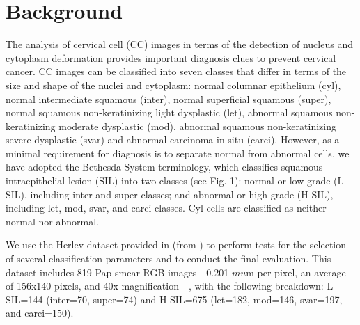 \documentclass{bmcart}
\begin{document}


\section*{Background}
The analysis of cervical cell (CC) images in terms of the detection of nucleus and cytoplasm deformation provides important diagnosis clues to prevent cervical cancer. CC images can be classified into seven classes\cite{1} that differ in terms of the size and shape of the nuclei and cytoplasm: normal columnar epithelium (cyl), normal intermediate squamous (inter), normal superficial squamous (super), normal squamous non-keratinizing light dysplastic (let), abnormal squamous non-keratinizing moderate dysplastic (mod), abnormal squamous non-keratinizing severe dysplastic (svar) and abnormal carcinoma in situ (carci). However, as a minimal requirement for diagnosis is to separate normal from abnormal cells\cite{2,3}, we have adopted the Bethesda System terminology\cite{4}, which classifies squamous intraepithelial lesion (SIL) into two classes (see Fig. 1): normal or low grade (L-SIL), including inter and super classes; and abnormal or high grade (H-SIL), including let, mod, svar, and carci classes. Cyl cells are classified as neither normal nor abnormal\cite{5,6}.

We use the Herlev dataset provided in \cite{1} (from \cite{7}) to perform tests for the selection of several classification parameters and to conduct the final evaluation. This dataset includes 819 Pap smear RGB images---0.201 $mu$m per pixel, an average of 156x140 pixels, and 40x magnification---, with the following breakdown: L-SIL=144 (inter=70, super=74) and H-SIL=675 (let=182, mod=146, svar=197, and carci=150).   
\end{document}
